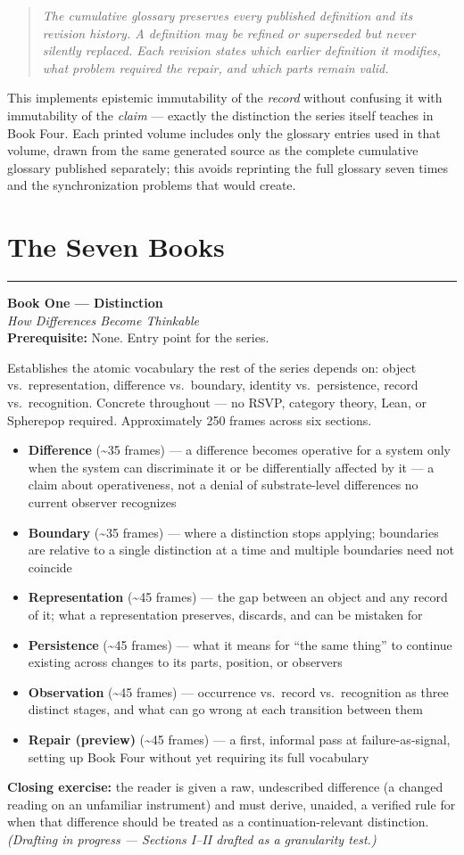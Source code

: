 \documentclass[11pt]{article}
\newenvironment{bookentry}[3]{%
  \par\noindent\rule{\linewidth}{0.5pt}\par\vspace{0.5em}
  {\Large\bfseries #1}\\[0.15em]
  {\itshape\large #2}\\[0.3em]
  {\small\textbf{Prerequisite:} #3}\par\vspace{0.6em}
}{\par\vspace{0.8em}}
\newenvironment{sectionlist}{%
  \begin{itemize}[leftmargin=1.4em, itemsep=0.45em, topsep=0.3em]
}{%
  \end{itemize}
}
\newcommand{\secitem}[3]{\item \textbf{#1} (\textasciitilde#2 frames) --- #3}
\begin{document}
\begin{quote}
\itshape The cumulative glossary preserves every published definition and its revision history. A definition may be refined or superseded but never silently replaced. Each revision states which earlier definition it modifies, what problem required the repair, and which parts remain valid.
\end{quote}

This implements epistemic immutability of the \emph{record} without confusing it with immutability of the \emph{claim} --- exactly the distinction the series itself teaches in Book Four. Each printed volume includes only the glossary entries used in that volume, drawn from the same generated source as the complete cumulative glossary published separately; this avoids reprinting the full glossary seven times and the synchronization problems that would create.

\section*{The Seven Books}

\begin{bookentry}{Book One --- Distinction}{How Differences Become Thinkable}{None. Entry point for the series.}
Establishes the atomic vocabulary the rest of the series depends on: object vs.\ representation, difference vs.\ boundary, identity vs.\ persistence, record vs.\ recognition. Concrete throughout --- no RSVP, category theory, Lean, or Spherepop required. Approximately 250 frames across six sections.

\begin{sectionlist}
\secitem{Difference}{35}{a difference becomes operative for a system only when the system can discriminate it or be differentially affected by it --- a claim about operativeness, not a denial of substrate-level differences no current observer recognizes}
\secitem{Boundary}{35}{where a distinction stops applying; boundaries are relative to a single distinction at a time and multiple boundaries need not coincide}
\secitem{Representation}{45}{the gap between an object and any record of it; what a representation preserves, discards, and can be mistaken for}
\secitem{Persistence}{45}{what it means for ``the same thing'' to continue existing across changes to its parts, position, or observers}
\secitem{Observation}{45}{occurrence vs.\ record vs.\ recognition as three distinct stages, and what can go wrong at each transition between them}
\secitem{Repair (preview)}{45}{a first, informal pass at failure-as-signal, setting up Book Four without yet requiring its full vocabulary}
\end{sectionlist}
\textbf{Closing exercise:} the reader is given a raw, undescribed difference (a changed reading on an unfamiliar instrument) and must derive, unaided, a verified rule for when that difference should be treated as a continuation-relevant distinction. \textit{(Drafting in progress --- Sections I--II drafted as a granularity test.)}
\end{bookentry}
\end{document}
